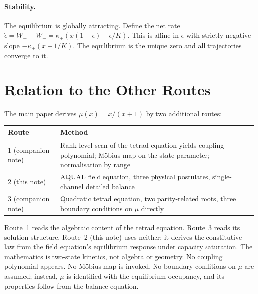 \documentclass[twocolumn]{iopjournal}
\begin{document}
\paragraph{Stability.}
The equilibrium is globally attracting. Define the net rate
$\dot{\epsilon} = W_+ - W_- = \kappa_+(x(1-\epsilon) -
\epsilon/K)$. This is affine in $\epsilon$ with strictly negative
slope $-\kappa_+(x + 1/K)$. The equilibrium is the unique zero
and all trajectories converge to it.


\section*{Relation to the Other Routes}

The main paper derives $\mu(x) = x/(x+1)$ by two additional
routes:

\vspace{6pt}
\noindent
\begin{tabular*}{\columnwidth}{@{\extracolsep{\fill}}lp{}@{}}
\hline
Route & Method \\
\hline
1 (companion note) & Rank-level scan of the tetrad equation
  yields coupling polynomial; M\"{o}bius map on the state
  parameter; normalisation by
  range~\cite{Nelson2026polynomial} \\
2 (this note) & AQUAL field equation, three physical
  postulates, single-channel detailed balance \\
3 (companion note) & Quadratic tetrad equation, two
  parity-related roots, three boundary conditions on $\mu$
  directly~\cite{Nelson2026mobius} \\
\hline
\end{tabular*}
\vspace{6pt}

Route~1 reads the algebraic content of the tetrad equation.
Route~3 reads its solution structure. Route~2 (this note) uses
neither: it derives the constitutive law from the field equation's
equilibrium response under capacity saturation. The mathematics is
two-state kinetics, not algebra or geometry. No coupling polynomial
appears. No M\"{o}bius map is invoked. No boundary conditions on
$\mu$ are assumed; instead, $\mu$ is identified with the equilibrium
occupancy, and its properties follow from the balance equation.

\end{document}
